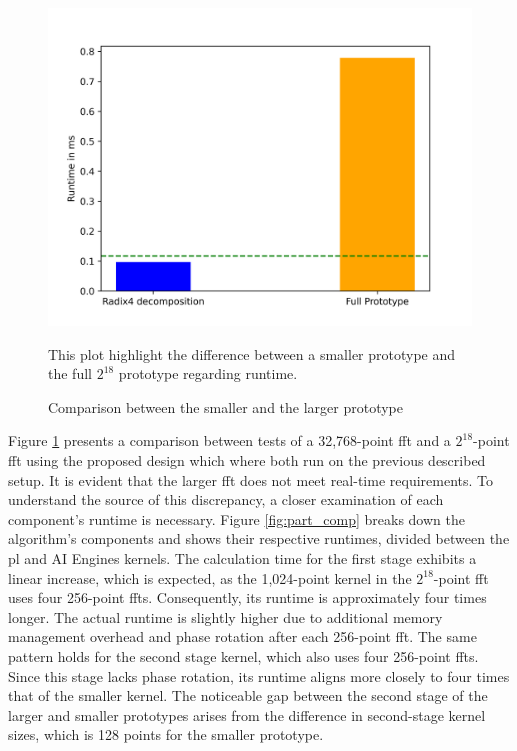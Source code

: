 \begin{figure}[h!]
    \centering
    \includegraphics[width=0.6\linewidth]{images/bar_chart.png}
    \captionsetup{justification=centering}
    \caption{Comparison between the smaller and the larger prototype}
        This plot highlight the difference between a smaller prototype and the full $2^{18}$ prototype regarding runtime.
    \label{fig:last_stage}
\end{figure}
    
Figure \ref{fig:last_stage} presents a comparison between tests of a 32,768-point \ac{fft} and a $2^{18}$-point \ac{fft} using the proposed design which where both run on the previous described setup. It is evident that the larger \ac{fft} does not meet real-time requirements. To understand the source of this discrepancy, a closer examination of each component’s runtime is necessary. Figure \ref{fig:part_comp} breaks down the algorithm’s components and shows their respective runtimes, divided between the \ac{pl} and AI Engines kernels. The calculation time for the first stage exhibits a linear increase, which is expected, as the 1,024-point kernel in the $2^{18}$-point \ac{fft} uses four 256-point \ac{fft}s. Consequently, its runtime is approximately four times longer. The actual runtime is slightly higher due to additional memory management overhead and phase rotation after each 256-point \ac{fft}. The same pattern holds for the second stage kernel, which also uses four 256-point \ac{fft}s. Since this stage lacks phase rotation, its runtime aligns more closely to four times that of the smaller kernel. The noticeable gap between the second stage of the larger and smaller prototypes arises from the difference in second-stage kernel sizes, which is 128 points for the smaller prototype.\par

